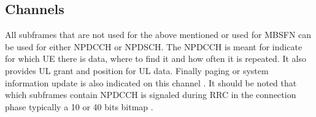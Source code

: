 \subsection{Channels} 
All subframes that are not used for the above mentioned or used for \gls{MBSFN} can be used for either \gls{NPDCCH} or \gls{NPDSCH}. The \gls{NPDCCH} is meant for indicate for which \gls{UE} there is data, where to find it and how often it is repeated. It also provides \gls{UL} grant and position for \gls{UL} data. Finally paging or system information update is also indicated on this channel \citep{whitepaper}. It should be noted that which subframes contain \gls{NPDCCH} is signaled during \gls{RRC} in the connection phase typically a 10 or 40 bits bitmap \citep{whitepaper}. 

